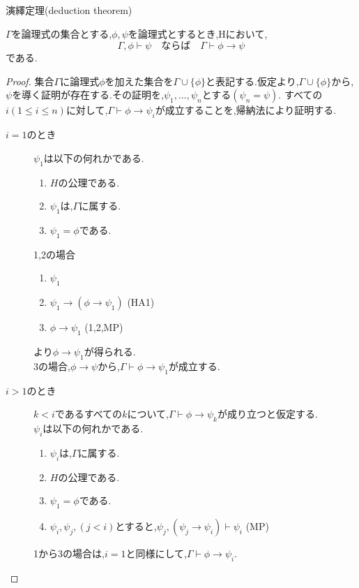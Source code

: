 \begin{thm}
 演繹定理(deduction theorem)

 $\Gamma$を論理式の集合とする,$\phi,\psi$を論理式とするとき,Hにおいて,
 \begin{equation*}
  \Gamma, \phi \vdash \psi \quad ならば \quad \Gamma \vdash \phi \to \psi
 \end{equation*}
 である.

\end{thm}
\begin{proof}
 集合$\Gamma$に論理式$\phi$を加えた集合を$\Gamma \cup \{\phi\}$と表記する.仮定より,$\Gamma \cup \{\phi\}$から,$\psi$を導く証明が存在する.その証明を,$\psi_1,...,\psi_n$とする$(\psi_n=\psi)$.
すべての$i(1 \leq i \leq n)$に対して,$\Gamma \vdash \phi \to \psi_i$が成立することを,帰納法により証明する.
 \begin{description}
  \item[$i=1$のとき] $\psi_1$は以下の何れかである.
			 \begin{enumerate}
			  \item $H$の公理である.
			  \item $\psi_1$は,$\Gamma$に属する.
			  \item $\psi_1=\phi$である.
			 \end{enumerate}
			 1,2の場合
			 \begin{enumerate}
			  \renewcommand{\labelenumi}{\arabic{enumi})}
			  \item $\psi_1$
			  \item $\psi_1 \to (\phi \to \psi_1)$ (HA1)
			  \item $\phi \to \psi_1$ (1,2,MP)
			 \end{enumerate}
			 より$\phi \to \psi_1$が得られる. \\
			 3の場合,$\phi \to \psi$から,$\Gamma \vdash \phi \to \psi_1$が成立する.
  \item[$i>1$のとき]
			 $k<i$であるすべての$k$について,$\Gamma \vdash \phi \to \psi_k$が成り立つと仮定する. \\
			 $\psi_i$は以下の何れかである.
			 \begin{enumerate}
			  \item $\psi_i$は,$\Gamma$に属する.
			  \item $H$の公理である.
			  \item $\psi_1=\phi$である.
			  \item $\psi_i,\psi_j,(j<i)$とすると,$\psi_j,(\psi_j\to\psi_i)\vdash\psi_i$ (MP)
			 \end{enumerate}
			 1から3の場合は,$i=1$と同様にして,$\Gamma \vdash \phi \to \psi_i$. \\

\end{description}
\end{proof}
